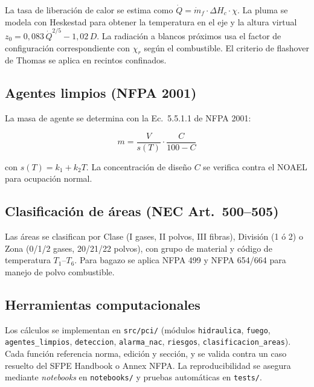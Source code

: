 La tasa de liberación de calor se estima como $\dot Q = \dot m_f \cdot \Delta H_c \cdot \chi$. La pluma se modela con Heskestad para obtener la temperatura en el eje y la altura virtual $z_0 = 0{,}083\,\dot Q^{2/5} - 1{,}02\,D$. La radiación a blancos próximos usa el factor de configuración correspondiente con $\chi_r$ según el combustible. El criterio de flashover de Thomas se aplica en recintos confinados.

\subsection{Agentes limpios (NFPA 2001)}

La masa de agente se determina con la Ec.\ 5.5.1.1 de NFPA 2001:

\begin{equation}
m = \frac{V}{s(T)} \cdot \frac{C}{100 - C}
\label{eq:agente}
\end{equation}

con $s(T) = k_1 + k_2 T$. La concentración de diseño $C$ se verifica contra el NOAEL para ocupación normal.

\subsection{Clasificación de áreas (NEC Art.\ 500–505)}

Las áreas se clasifican por Clase (I gases, II polvos, III fibras), División (1 ó 2) o Zona (0/1/2 gases, 20/21/22 polvos), con grupo de material y código de temperatura $T_1$–$T_6$. Para bagazo se aplica NFPA 499 y NFPA 654/664 para manejo de polvo combustible.

\subsection{Herramientas computacionales}

Los cálculos se implementan en \texttt{src/pci/} (módulos \texttt{hidraulica}, \texttt{fuego}, \texttt{agentes\_limpios}, \texttt{deteccion}, \texttt{alarma\_nac}, \texttt{riesgos}, \texttt{clasificacion\_areas}). Cada función referencia norma, edición y sección, y se valida contra un caso resuelto del SFPE Handbook o Annex NFPA. La reproducibilidad se asegura mediante \textit{notebooks} en \texttt{notebooks/} y pruebas automáticas en \texttt{tests/}.
